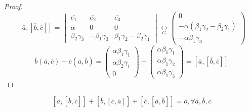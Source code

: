 \begin{proof}
\[  [\overline{a}, [\overline{b}, \overline{c}]] = \begin{vmatrix}\overline{e_1} & \overline{e_2} & \overline{e_3} \\ \alpha & 0 & 0 \\ \beta_2\gamma_3 & -\beta_1\gamma_3 & \beta_1\gamma_2 - \beta_2\gamma_1 \end{vmatrix} \underset{G}{\longleftrightarrow} \begin{pmatrix} 0 \\ -\alpha(\beta_1\gamma_2 - \beta_2\gamma_1) \\ -\alpha\beta_1\gamma_3 \end{pmatrix}
\]
\[
  \overline{b}(\overline{a}, \overline{c}) - \overline{c}(\overline{a}, \overline{b}) = \begin{pmatrix}\alpha\beta_1\gamma_1 \\ \alpha\beta_2\gamma_1 \\ 0 \end{pmatrix} - \begin{pmatrix}\alpha\beta_1\gamma_1 \\ \alpha\beta_1\gamma_2 \\ \alpha\beta_1\gamma_3 \end{pmatrix} = [\overline{a}, [\overline{b}, \overline{c}]]
\]
\end{proof}
\begin{consequence}
\[
[\overline{a}, [\overline{b}, \overline{c}]] + [\overline{b}, [\overline{c}, \overline{a}]] + [\overline{c}, [\overline{a}, \overline{b}]] = \overline{o}, \forall \overline{a}, \overline{b}, \overline{c}
\]
\end{consequence}

